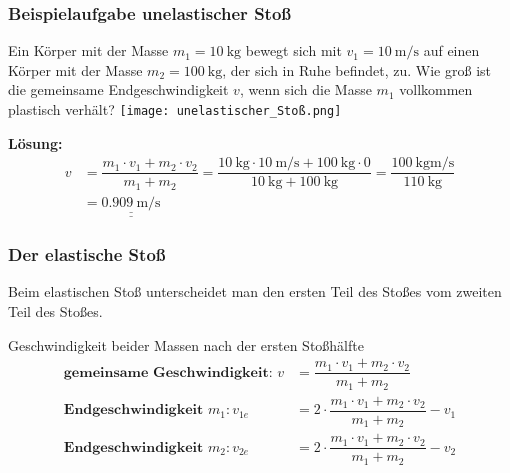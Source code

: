 \documentclass{article}
\newcommand{\Ergebnis}[1]{\underline{\underline{#1}}}
\begin{document}
\frame
{
{
  \frametitle{Beispielaufgabe unelastischer Stoß}
Ein Körper mit der Masse $m_1=\SI{10}{\kilogram}$ bewegt sich mit $v_1=\SI{10}{\meter\per\second}$ auf einen Körper mit der Masse $m_2=\SI{100}{\kilogram}$, der sich in Ruhe befindet, zu. Wie groß ist die gemeinsame Endgeschwindigkeit $v$, wenn sich die Masse $m_1$ vollkommen plastisch verhält?
\texttt{[image: unelastischer\_Stoß.png]}\\
}
{
\textbf{Lösung:}	
	\begin{align*}
	v&=\dfrac{m_1\cdot v_1+m_2\cdot v_2}{m_1+m_2}=\dfrac{\SI{10}{\kilogram}\cdot \SI{10}{\meter\per\second}+\SI{100}{\kilogram}\cdot 0}{\SI{10}{\kilogram}+\SI{100}{\kilogram}}=\dfrac{\SI{100}{\kilogram\meter\per\second}}{\SI{110}{\kilogram}}\\&=\Ergebnis{\SI{0,909}{\meter\per\second}}
	\end{align*}
}
}

\frame
{
  \frametitle{Der elastische Stoß}
  Beim elastischen Stoß unterscheidet man den ersten Teil des Stoßes vom zweiten Teil des Stoßes.
  \begin{block}{Geschwindigkeit beider Massen nach der ersten Stoßhälfte}
	\begin{align*}
	\textbf{gemeinsame Geschwindigkeit: }v&=\dfrac{m_1\cdot v_1+m_2\cdot v_2}{m_1+m_2}\\
	\textbf{Endgeschwindigkeit }m_1:v_{1e}&=2\cdot\dfrac{m_1\cdot v_1+m_2\cdot v_2}{m_1+m_2}-v_1\\
	\textbf{Endgeschwindigkeit }m_2:v_{2e}&=2\cdot\dfrac{m_1\cdot v_1+m_2\cdot v_2}{m_1+m_2}-v_2\\
	\end{align*}
  \end{block}
}
\end{document}
